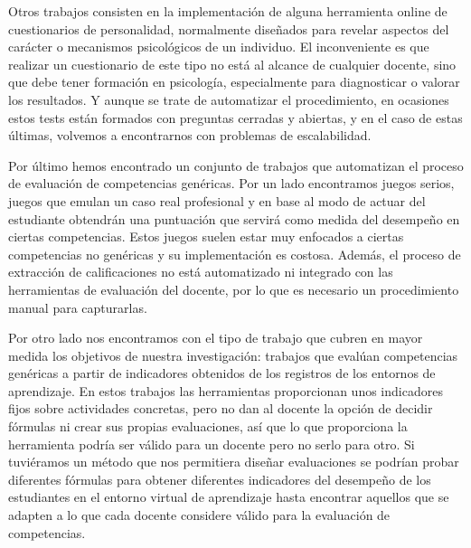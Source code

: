Otros trabajos consisten en la implementación de alguna herramienta online de cuestionarios de personalidad, normalmente diseñados para revelar aspectos del carácter o mecanismos psicológicos de un individuo. El inconveniente es que realizar un cuestionario de este tipo no está al alcance de cualquier docente, sino que debe tener formación en psicología, especialmente para diagnosticar o valorar los resultados. Y aunque se trate de automatizar el procedimiento, en ocasiones estos tests están formados con preguntas cerradas y abiertas, y en el caso de estas últimas, volvemos a encontrarnos con problemas de escalabilidad.

Por último hemos encontrado un conjunto de trabajos que automatizan el proceso de evaluación de competencias genéricas. Por un lado encontramos juegos serios, juegos que emulan un caso real profesional y en base al modo de actuar del estudiante obtendrán una puntuación que servirá como medida del desempeño en ciertas competencias. Estos juegos suelen estar muy enfocados a ciertas competencias no genéricas y su implementación es costosa. Además, el proceso de extracción de calificaciones no está automatizado ni integrado con las herramientas de evaluación del docente, por lo que es necesario un procedimiento manual para capturarlas.

Por otro lado nos encontramos con el tipo de trabajo que cubren en mayor medida los objetivos de nuestra investigación: trabajos que evalúan competencias genéricas a partir de indicadores obtenidos de los registros de los entornos de aprendizaje. En estos trabajos las herramientas proporcionan unos indicadores fijos sobre actividades concretas, pero no dan al docente la opción de decidir fórmulas ni crear sus propias evaluaciones, así que lo que proporciona la herramienta podría ser válido para un docente pero no serlo para otro. Si tuviéramos un método que nos permitiera diseñar evaluaciones se podrían probar diferentes fórmulas para obtener diferentes indicadores del desempeño de los estudiantes en el entorno virtual de aprendizaje hasta encontrar aquellos que se adapten a lo que cada docente considere válido para la evaluación de competencias.

\pagestyle{fancy}



